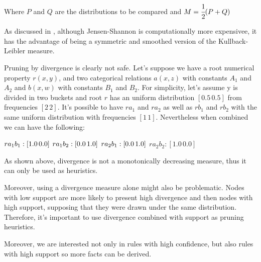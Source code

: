 Where $P$ and $Q$ are the distributions to be compared and $M=\cfrac{1}{2}(P+Q)$

As discussed in \cite{17795}, although Jensen-Shannon is computationally more expensivee, it has the advantage of being a symmetric and smoothed version of the Kullback-Leibler measure.

Pruning by divergence is clearly not safe. Let's suppose we have a root numerical property $r(x,y)$, and two categorical relations $a(x,z)$ with constants $A_1$ and $A_2$ and $b(x,w)$ with constants $B_1$ and $B_2$. For simplicity, let's assume y is divided in two buckets and root $r$ has an uniform distribution $[0.5 \, 0.5]$ from frequencies $[2 \, 2]$. It's possible to have $r a_1$ and $r a_2$ as well as $r b_1$ and $r b_2$ with the same uniform distribution with frequencies $[1 \, 1]$. Nevertheless when combined we can have the following:

$r a_1 b_1 : [1.0 \, 0.0] \\$
$r a_1 b_2 : [0.0 \, 1.0] \\$
$r a_2 b_1 : [0.0 \, 1.0] \\$
$r a_2 b_2 : [1.0 \, 0.0]$

As shown above, divergence is not a monotonically decreasing measure, thus it can only be used as heuristics.


Moreover, using a divergence measure alone might also be problematic. Nodes with low support are more likely to present high divergence and then nodes with high support, supposing that they were drawn under the same distribution. Therefore, it's important to use divergence combined with support as pruning heuristics.

Moreover, we are interested not only in rules with high confidence, but also rules with high support so more facts can be derived.





